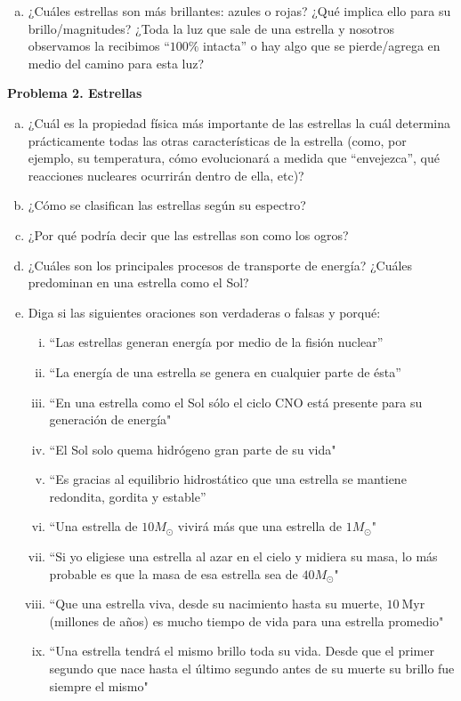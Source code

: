 \documentclass{article}
\begin{document}
\begin{enumerate} [a)]
\item ¿Cuáles estrellas son más brillantes: azules o rojas? ¿Qué implica ello para su brillo/magnitudes? ¿Toda la luz que sale de una estrella y nosotros observamos la recibimos ``$100 \%$ intacta'' o hay algo que se pierde/agrega en medio del camino para esta luz?
\end{enumerate}


\textbf{Problema 2. Estrellas}

\begin{enumerate} [a)]
\item ¿Cuál es  la propiedad física más importante de las estrellas la cuál determina prácticamente todas las otras características de la estrella (como, por ejemplo, su temperatura, cómo evolucionará a medida que ``envejezca'', qué reacciones nucleares ocurrirán dentro de ella, etc)?

\item ¿Cómo se clasifican las estrellas según su espectro?

\item ¿Por qué podría decir que las estrellas son como los ogros?

\item ¿Cuáles son los principales procesos de transporte de energía? ¿Cuáles predominan en una estrella como el Sol?

\item Diga si las siguientes oraciones son verdaderas o falsas y porqué:
\begin{enumerate} [i)]
\item ``Las estrellas generan energía por medio de la fisión nuclear''
\item ``La energía de una estrella se genera en cualquier parte de ésta''
\item ``En una estrella como el Sol sólo el ciclo CNO está presente para su generación de energía"
\item ``El Sol solo quema hidrógeno gran parte de su vida"
\item ``Es gracias al equilibrio hidrostático que una estrella se mantiene redondita, gordita y estable''
\item ``Una estrella de $10M_\odot$ vivirá más que una estrella de $1 M_\odot$"
\item ``Si yo eligiese una estrella al azar en el cielo y midiera su masa, lo más probable es que la masa de esa estrella sea de $40 M_\odot$"
\item ``Que una estrella viva, desde su nacimiento hasta su muerte, $10 \ \text{Myr}$ (millones de años) es mucho tiempo de vida para una estrella promedio"
\item ``Una estrella tendrá el mismo brillo toda su vida. Desde que el primer segundo que nace hasta el último segundo antes de su muerte su brillo fue siempre el mismo"
\end{enumerate}
\end{enumerate}
\end{document}
